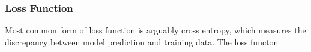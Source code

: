 \subsubsection{Loss Function}

Most common form of loss function is arguably cross entropy, which measures the discrepancy between model prediction and training data. The loss functon 